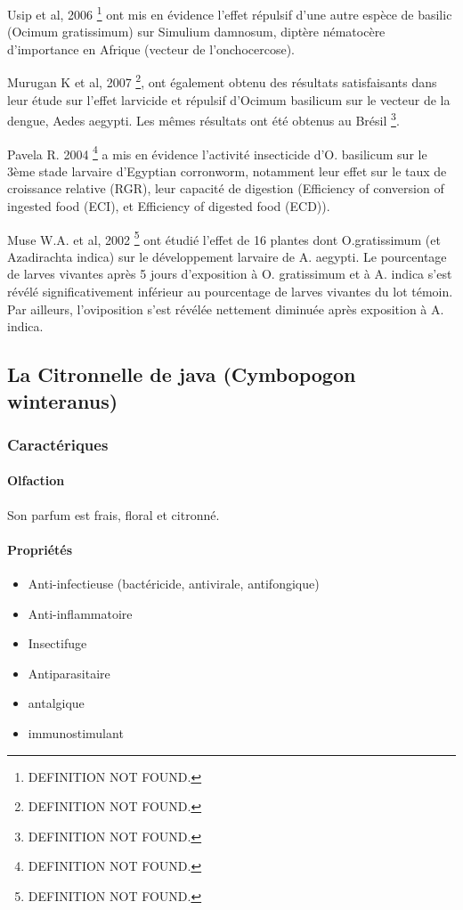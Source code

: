 \documentclass[12pt,a4wide]{article}
\begin{document}
Usip et al, 2006 \footnote{DEFINITION NOT FOUND.} ont mis en évidence l'effet répulsif d'une autre espèce de
basilic  (Ocimum   gratissimum)  sur   Simulium  damnosum,   diptère  nématocère
d'importance en Afrique (vecteur de l'onchocercose).

Murugan K  et al, 2007  \footnote{DEFINITION NOT FOUND.}, ont  également obtenu des  résultats satisfaisants
dans leur  étude sur  l'effet larvicide  et répulsif  d'Ocimum basilicum  sur le
vecteur de  la dengue,  Aedes aegypti.  Les mêmes résultats  ont été  obtenus au
Brésil \footnote{DEFINITION NOT FOUND.}.

Pavela R. 2004 \footnote{DEFINITION NOT FOUND.} a mis  en évidence l'activité insecticide d'O. basilicum sur
le 3ème stade  larvaire d'Egyptian corronworm, notamment leur effet  sur le taux
de  croissance  relative  (RGR),  leur  capacité  de  digestion  (Efficiency  of
conversion of ingested food (ECI), et Efficiency of digested food (ECD)).

Muse W.A. et al,  2002 \footnote{DEFINITION NOT FOUND.} ont étudié l'effet de  16 plantes dont O.gratissimum
(et  Azadirachta  indica)  sur  le  développement larvaire  de  A.  aegypti.  Le
pourcentage de larves vivantes après 5  jours d'exposition à O. gratissimum et à
A.  indica s'est  révélé significativement  inférieur au  pourcentage de  larves
vivantes  du lot  témoin. Par  ailleurs, l'oviposition  s'est révélée  nettement
diminuée après exposition à A. indica.





\subsection{La Citronnelle de java (Cymbopogon winteranus)}
\label{sec-4-5}
\subsubsection{Caractériques}
\label{sec-4-5-1}
\paragraph{Olfaction}
\label{sec-4-5-1-1}
Son parfum est frais, floral et citronné.
\paragraph{Propriétés}
\label{sec-4-5-1-2}
\begin{itemize}
\item Anti-infectieuse (bactéricide, antivirale, antifongique)
\item Anti-inflammatoire
\item Insectifuge
\item Antiparasitaire
\item antalgique
\item immunostimulant
\end{itemize}
\end{document}

